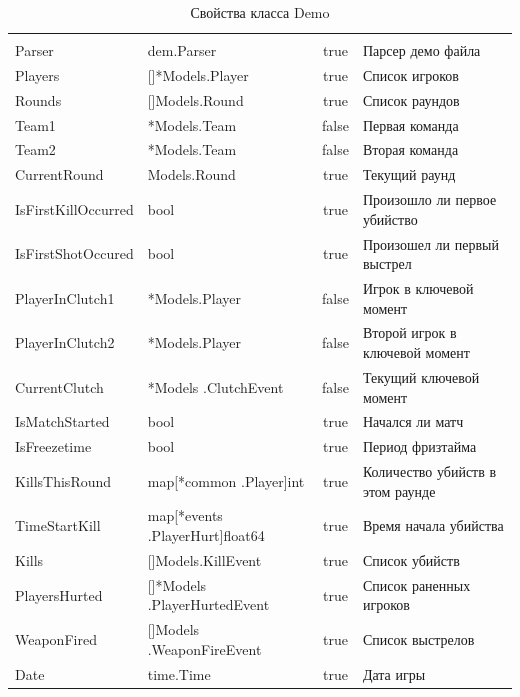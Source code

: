 \begin{xltabular}{\textwidth}{|X|X|c|X|}
	\caption{Свойства класса Demo}\label{table:Demo}\\ \hline
	 &  &  &  \\ \hline
	\endfirsthead
	 \hline
	 &  &  &  \\ \hline
	\endhead
	Parser & dem.Parser & true & Парсер демо файла \\ \hline
	Players & []*Models.Player & true & Список игроков \\ \hline
	Rounds & []Models.Round & true & Список раундов \\ \hline
	Team1 & *Models.Team & false & Первая команда \\ \hline
	Team2 & *Models.Team & false & Вторая команда \\ \hline
	CurrentRound & Models.Round & true & Текущий раунд \\ \hline
	IsFirstKillOccurred & bool & true & Произошло ли первое убийство \\ \hline
	IsFirstShotOccured & bool & true & Произошел ли первый выстрел \\ \hline
	PlayerInClutch1 & *Models.Player & false & Игрок в ключевой момент \\ \hline
	PlayerInClutch2 & *Models.Player & false & Второй игрок в ключевой момент \\ \hline
	CurrentClutch & *Models
	.ClutchEvent & false & Текущий ключевой момент \\ \hline
	IsMatchStarted & bool & true & Начался ли матч \\ \hline
	IsFreezetime & bool & true & Период фризтайма \\ \hline
	KillsThisRound & map[*common
	.Player]int & true & Количество убийств в этом раунде \\ \hline
	TimeStartKill & map[*events
	.PlayerHurt]float64 & true & Время начала убийства \\ \hline
	Kills & []Models.KillEvent & true & Список убийств \\ \hline
	PlayersHurted & []*Models
	.PlayerHurtedEvent & true & Список раненных игроков \\ \hline
	WeaponFired & []Models
	.WeaponFireEvent & true & Список выстрелов \\ \hline
	Date & time.Time & true & Дата игры \\ \hline
\end{xltabular}

